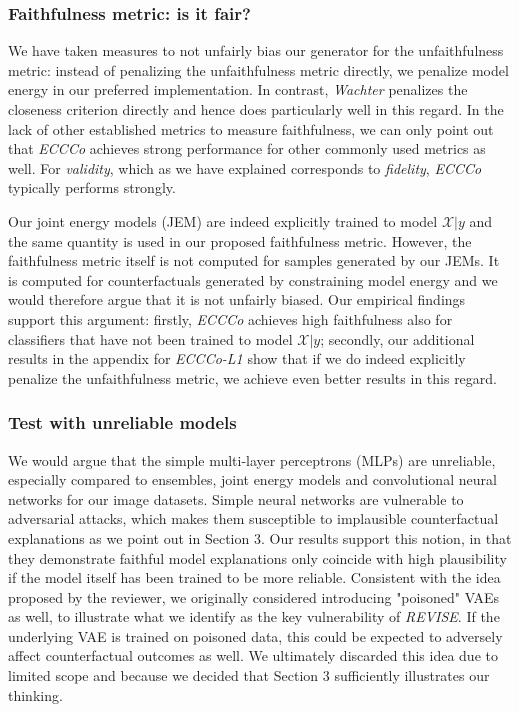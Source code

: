 \documentclass[letterpaper]{article} %
\begin{document}
\subsubsection{Faithfulness metric: is it fair?}

We have taken measures to not unfairly bias our generator for the unfaithfulness metric: instead of penalizing the unfaithfulness metric directly, we penalize model energy in our preferred implementation. In contrast, \textit{Wachter} penalizes the closeness criterion directly and hence does particularly well in this regard. In the lack of other established metrics to measure faithfulness, we can only point out that \textit{ECCCo} achieves strong performance for other commonly used metrics as well. For \textit{validity}, which as we have explained corresponds to \textit{fidelity}, \textit{ECCCo} typically performs strongly.

Our joint energy models (JEM) are indeed explicitly trained to model $\mathcal{X}|y$ and the same quantity is used in our proposed faithfulness metric. However, the faithfulness metric itself is not computed for samples generated by our JEMs. It is computed for counterfactuals generated by constraining model energy and we would therefore argue that it is not unfairly biased. Our empirical findings support this argument: firstly, \textit{ECCCo} achieves high faithfulness also for classifiers that have not been trained to model $\mathcal{X}|y$; secondly, our additional results in the appendix for \textit{ECCCo-L1} show that if we do indeed explicitly penalize the unfaithfulness metric, we achieve even better results in this regard. 

\subsubsection{Test with unreliable models}

We would argue that the simple multi-layer perceptrons (MLPs) are unreliable, especially compared to ensembles, joint energy models and convolutional neural networks for our image datasets. Simple neural networks are vulnerable to adversarial attacks, which makes them susceptible to implausible counterfactual explanations as we point out in Section 3. Our results support this notion, in that they demonstrate faithful model explanations only coincide with high plausibility if the model itself has been trained to be more reliable. Consistent with the idea proposed by the reviewer, we originally considered introducing "poisoned" VAEs as well, to illustrate what we identify as the key vulnerability of \textit{REVISE}. If the underlying VAE is trained on poisoned data, this could be expected to adversely affect counterfactual outcomes as well. We ultimately discarded this idea due to limited scope and because we decided that Section 3 sufficiently illustrates our thinking. 
\end{document}
